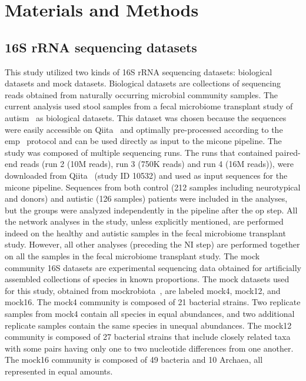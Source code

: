 
\section*{Materials and Methods}

  \subsection*{16S rRNA sequencing datasets}
  \vspace{-5mm}
  This study utilized two kinds of 16S rRNA sequencing datasets: biological datasets and mock datasets.
  Biological datasets are collections of sequencing reads obtained from naturally occurring microbial community samples.
  The current analysis used stool samples from a fecal microbiome transplant study of autism~\cite{Kang2017} as biological datasets.
  This dataset was chosen because the sequences were easily accessible on Qiita~\cite{qiita} and optimally pre-processed according to the \ac{emp}~\cite{Thompson2017} protocol and can be used directly as input to the \ac{micone} pipeline.
  The study was composed of multiple sequencing runs.
  The runs that contained paired-end reads (run 2 (10M reads), run 3 (750K reads) and run 4 (16M reads)), were downloaded from Qiita~\cite{qiita} (study ID 10532) and used as input sequences for the \ac{micone} pipeline.
  Sequences from both control (212 samples including neurotypical and donors) and autistic (126 samples) patients were included in the analyses, but the groups were analyzed independently in the pipeline after the \ac{op} step.
  All the network analyses in the study, unless explicitly mentioned, are performed indeed on the healthy and autistic samples in the fecal microbiome transplant study.
  However, all other analyses (preceding the NI step) are performed together on all the samples in the fecal microbiome transplant study.
  The mock community 16S datasets are experimental sequencing data obtained for artificially assembled collections of species in known proportions.
  The mock datasets used for this study, obtained from mockrobiota~\cite{Bokulich2016}, are labeled mock4, mock12, and mock16.
  The mock4 community is composed of 21 bacterial strains.
  Two replicate samples from mock4 contain all species in equal abundances, and two additional replicate samples contain the same species in unequal abundances.
  The mock12 community is composed of 27 bacterial strains that include closely related taxa with some pairs having only one to two nucleotide differences from one another.
  The mock16 community is composed of 49 bacteria and 10 Archaea, all represented in equal amounts.

